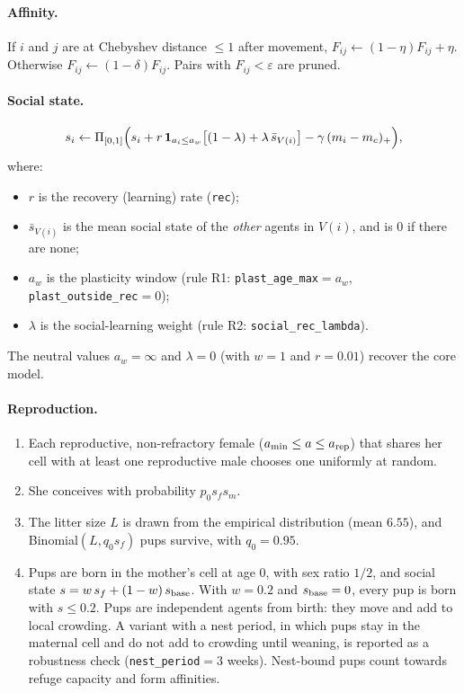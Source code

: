 \paragraph{Affinity.}
If $i$ and $j$ are at Chebyshev distance $\le1$ after movement, $F_{ij}\leftarrow(1-\eta)F_{ij}+\eta$.
Otherwise $F_{ij}\leftarrow(1-\delta)F_{ij}$.
Pairs with $F_{ij}<\varepsilon$ are pruned.

\paragraph{Social state.}
\[
s_i\leftarrow\Pi_{[0,1]}\Bigl(s_i+r\,\mathbf 1_{a_i\le a_w}\bigl[(1-\lambda)+\lambda\,\bar s_{V(i)}\bigr]
-\gamma\,(m_i-m_c)_+\Bigr),
\]
where:
\begin{itemize}
\item $r$ is the recovery (learning) rate (\texttt{rec});
\item $\bar s_{V(i)}$ is the mean social state of the \emph{other} agents in $V(i)$, and is $0$ if there are none;
\item $a_w$ is the plasticity window (rule R1: \texttt{plast\_age\_max}${}=a_w$, \texttt{plast\_outside\_rec}${}=0$);
\item $\lambda$ is the social-learning weight (rule R2: \texttt{social\_rec\_lambda}).
\end{itemize}
The neutral values $a_w=\infty$ and $\lambda=0$ (with $w=1$ and $r=0.01$) recover the core model.

\paragraph{Reproduction.}
\begin{enumerate}
\item Each reproductive, non-refractory female ($a_{\min}\le a\le a_{\rm rep}$) that shares her cell with at least one
  reproductive male chooses one uniformly at random.
\item She conceives with probability $p_0 s_f s_m$.
\item The litter size $L$ is drawn from the empirical distribution (mean $6.55$), and Binomial$(L,q_0 s_f)$ pups
  survive, with $q_0=0.95$.
\item Pups are born in the mother's cell at age $0$, with sex ratio $1/2$, and social state
  $s=w\,s_f+(1-w)\,s_{\rm base}$. With $w=0.2$ and $s_{\rm base}=0$, every pup is born with $s\le0.2$. Pups are
  independent agents from birth: they move and add to local crowding. A variant with a nest period, in which pups stay
  in the maternal cell and do not add to crowding until weaning, is reported as a robustness check (\texttt{nest\_period}${}=3$
  weeks). Nest-bound pups count towards refuge capacity and form affinities.
\end{enumerate}

